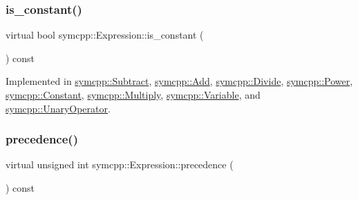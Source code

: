 \mbox{\label{classsymcpp_1_1Expression_a30db7917c8948e22330cbe8259caeae2}} 
\subsubsection{\texorpdfstring{is\_constant()}{is\_constant()}}
{\footnotesize\ttfamily virtual bool symcpp\+::\+Expression\+::is\+\_\+constant (\begin{DoxyParamCaption}{ }\end{DoxyParamCaption}) const\hspace{0.3cm}{\ttfamily [pure virtual]}}



Implemented in \mbox{\hyperlink{classsymcpp_1_1Subtract_a651ca7fc5e804970141b65813e738463}{symcpp\+::\+Subtract}}, \mbox{\hyperlink{classsymcpp_1_1Add_a6a9286402a1b24bf3a7c1ed348357875}{symcpp\+::\+Add}}, \mbox{\hyperlink{classsymcpp_1_1Divide_a342ddc6fb6f80a37797bda030b4c7580}{symcpp\+::\+Divide}}, \mbox{\hyperlink{classsymcpp_1_1Power_af90cd850099fda788416ab5aa9e752e2}{symcpp\+::\+Power}}, \mbox{\hyperlink{classsymcpp_1_1Constant_af1ae4532a85ec5c5ed55ed8d69be68b3}{symcpp\+::\+Constant}}, \mbox{\hyperlink{classsymcpp_1_1Multiply_a771fc25f8bafd49600c31db11dd72256}{symcpp\+::\+Multiply}}, \mbox{\hyperlink{classsymcpp_1_1Variable_a1ccd5094922661828039f16b77974fe0}{symcpp\+::\+Variable}}, and \mbox{\hyperlink{classsymcpp_1_1UnaryOperator_abb499ba635a63dfa605fc3639509ac1c}{symcpp\+::\+Unary\+Operator}}.

\mbox{\label{classsymcpp_1_1Expression_a181c162d5740faac392ffdca26bfca0c}} 
\subsubsection{\texorpdfstring{precedence()}{precedence()}}
{\footnotesize\ttfamily virtual unsigned int symcpp\+::\+Expression\+::precedence (\begin{DoxyParamCaption}{ }\end{DoxyParamCaption}) const\hspace{0.3cm}{\ttfamily [pure virtual]}}



